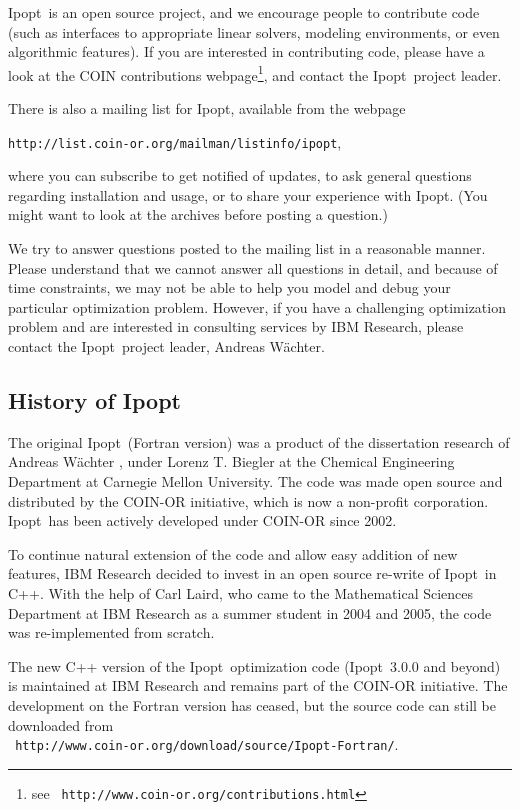 \documentclass[10pt]{article}
\newcommand{\Ipopt}{{\sc Ipopt}}
\begin{document}
\Ipopt\ is an open source project, and we encourage people to
contribute code (such as interfaces to appropriate linear solvers,
modeling environments, or even algorithmic features).  If you are
interested in contributing code, please have a look at the COIN
contributions webpage\footnote{see \tt
  http://www.coin-or.org/contributions.html}, and contact the \Ipopt\
project leader.

There is also a mailing list for \Ipopt, available from the webpage
\begin{center}
\texttt{http://list.coin-or.org/mailman/listinfo/ipopt},
\end{center}
where you can subscribe to get notified of updates, to ask general
questions regarding installation and usage, or to share your
experience with \Ipopt. (You might want to look at the archives before
posting a question.)

We try to answer questions posted to the mailing list in a reasonable
manner.  Please understand that we cannot answer all questions in
detail, and because of time constraints, we may not be able to help
you model and debug your particular optimization problem.  However, if
you have a challenging optimization problem and are interested in
consulting services by IBM Research, please contact the \Ipopt\
project leader, Andreas W\"achter.

\subsection{History of \Ipopt}
The original \Ipopt\ (Fortran version) was a product of the dissertation
research of Andreas W\"achter \cite{WaechterPhD}, under Lorenz
T. Biegler at the Chemical Engineering Department at Carnegie Mellon
University. The code was made open source and distributed by the
COIN-OR initiative, which is now a non-profit corporation.  \Ipopt\ has
been actively developed under COIN-OR since 2002.

To continue natural extension of the code and allow easy addition of
new features, IBM Research decided to invest in an open source
re-write of \Ipopt\ in C++.  With the help of Carl Laird, who came to
the Mathematical Sciences Department at IBM Research as a summer
student in 2004 and 2005, the code was re-implemented from
scratch.

The new C++ version of the \Ipopt\ optimization code (\Ipopt\ 3.0.0
and beyond) is maintained at IBM Research and remains part of the
COIN-OR initiative. The development on the Fortran version has
ceased, but the source code can still be downloaded from\\ {\tt
  http://www.coin-or.org/download/source/Ipopt-Fortran/}.
\end{document}
